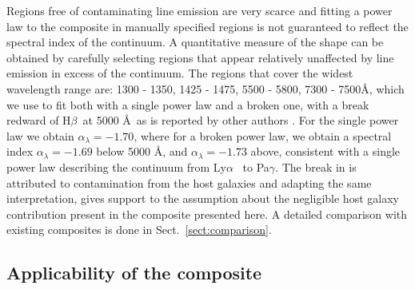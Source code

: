 \documentclass{aa}    %
\newcommand{\sectionname}{Sect.}
\newcommand{\Sect}[1]{\sectionname~\ref{sect:#1}}
\newcommand{\sect}[1]{\Sect{#1}}
\newcommand{\sectlabel}[1]{\label{sect:#1}}
\newcommand{\lya}{Ly$\alpha$}
\newcommand{\hb}{H$\beta$}
\begin{document}
Regions free of contaminating line emission are very scarce and fitting a
power law to the composite in manually specified regions is not guaranteed to
reflect the spectral index of the continuum. A quantitative measure of the shape
can be obtained by carefully selecting regions that appear relatively unaffected
by line emission in excess of the continuum. The regions that cover the widest
wavelength range are: 1300 - 1350, 1425 - 1475, 5500 - 5800, 7300 - 7500\AA,
which we use to fit both with a single power law and a broken one, with a
break redward of \hb~at 5000 \AA~as is reported by other authors
\citep[e.g.,][]{VandenBerk2001}. For the single power law we obtain
$\alpha_\lambda = -1.70$, where for a broken power law, we obtain a spectral
index $\alpha_\lambda = -1.69$ below 5000 \AA, and $\alpha_\lambda = -1.73$
above, consistent with a single power law describing the continuum from \lya
~to Pa$\gamma$. The break in \cite{VandenBerk2001} is attributed to
contamination from the host galaxies \citep{Glikman2006} and adapting the same
interpretation, gives support to the assumption about the negligible host galaxy
contribution present in the composite presented here. A detailed comparison with
existing composites is done in \sect{comparison}.


\subsection{Applicability of the composite}  \sectlabel{application}
\end{document}
